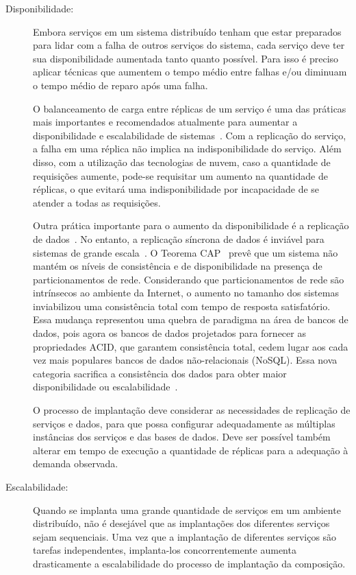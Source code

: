 \begin{description}
\item [Disponibilidade:]

Embora serviços em um sistema distribuído tenham que estar preparados para lidar
com a falha de outros serviços do sistema,
cada serviço deve ter sua disponibilidade aumentada tanto quanto possível. 
Para isso é preciso aplicar técnicas que
aumentem o tempo médio entre falhas e/ou diminuam o tempo médio de reparo após uma falha.

O balanceamento de carga entre réplicas de um serviço é uma das práticas mais importantes e 
recomendados atualmente para aumentar a disponibilidade e escalabilidade de sistemas~\cite{Amazon2012Practices}.
Com a replicação do serviço, a falha em uma réplica não implica na indisponibilidade
do serviço. Além disso, com a utilização das tecnologias de nuvem,
caso a quantidade de requisições aumente, pode-se requisitar um aumento na quantidade de réplicas,
o que evitará uma indisponibilidade por incapacidade de se atender a todas as requisições.

Outra prática importante para o aumento da disponibilidade é a replicação de dados~\cite{Brewer2001GiantScale}.
No entanto, a replicação síncrona de dados é inviável para sistemas de grande escala~\cite{Helland2009Quicksand}.
O Teorema CAP~\cite{Brewer2012Cap} prevê que um sistema não mantém os níveis de consistência e de disponibilidade na presença de particionamentos de rede. Considerando que particionamentos de rede são intrínsecos ao ambiente da Internet, o aumento no tamanho dos sistemas inviabilizou uma consistência total com tempo de resposta satisfatório. 
Essa mudança representou uma quebra de paradigma na área de bancos de dados,
pois agora os bancos de dados projetados para fornecer as propriedades ACID,
que garantem consistência total, cedem lugar aos cada vez mais populares
bancos de dados não-relacionais (NoSQL).
Essa nova categoria sacrifica a consistência dos dados para obter maior disponibilidade ou escalabilidade~\cite{Cattell2011NoSql}.

O processo de implantação deve considerar as necessidades de replicação de serviços e dados,
para que possa configurar adequadamente as múltiplas instâncias dos serviços e das bases de dados.
Deve ser possível também alterar em tempo de execução a quantidade de réplicas para
a adequação à demanda observada.

\item [Escalabilidade:]

Quando se implanta uma grande quantidade de serviços em um ambiente distribuído,
não é desejável que as implantações dos diferentes serviços sejam sequenciais.
Uma vez que a implantação de diferentes serviços são tarefas independentes,
implanta-los concorrentemente aumenta drasticamente a escalabilidade
do processo de implantação da composição.


\end{description}
